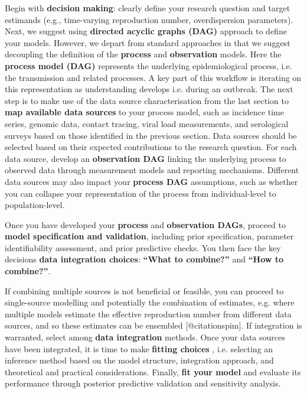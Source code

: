 \documentclass{article}
\begin{document}
Begin with \textbf{decision making}: clearly define your research question and target estimands (e.g., time-varying reproduction number, overdispersion parameters).
Next, we suggest using \textbf{directed acyclic graphs (DAG)} approach to define your models. However, we depart from standard approaches in that we suggest decoupling the definition of the \textbf{process} and \textbf{observation} models.
Here the \textbf{process model (DAG)} represents the underlying epidemiological process, i.e. the transmission and related processes.
A key part of this workflow is iterating on this representation as understanding develops i.e. during an outbreak.
The next step is to make use of the data source characterisation from the last section to \textbf{map available \textbf{data sources} }to your process model, such as incidence time series, genomic data, contact tracing, viral load measurements, and serological surveys based on those identified in the previous section.
Data sources should be selected based on their expected contributions to the research question.
For each data source, develop an \textbf{observation DAG} linking the underlying process to observed data through measurement models and reporting mechanisms.
Different data sources may also impact your \textbf{process DAG} assumptions, such as whether you can collapse your representation of the process from individual-level to population-level.

Once you have developed your \textbf{process} and \textbf{observation DAGs}, proceed to \textbf{model specification and validation}, including prior specification, parameter identifiability assessment, and prior predictive checks.
You then face the key decisions \textbf{data integration choices}: \textbf{``What to combine?''} and \textbf{``How to combine?''}.

If combining multiple sources is not beneficial or feasible, you can proceed to single-source modelling and potentially the combination of estimates, e.g. where multiple models estimate the effective reproduction number from different data sources, and so these estimates can be ensembled [@citationspim].
If integration is warranted, select among \textbf{data integration} methods. 
Once your data sources have been integrated, it is time to make \textbf{fitting choices} , i.e. selecting an inference method based on the model structure, integration approach, and theoretical and practical considerations. 
Finally, \textbf{fit your model} and evaluate its performance through posterior predictive validation and sensitivity analysis.
\end{document}
